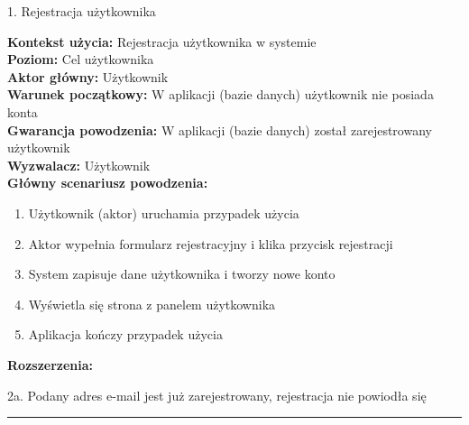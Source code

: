 {\noindent \bf{\large 1. Rejestracja użytkownika\par}}
\vspace{0.5cm}
{\noindent \bf Kontekst użycia: } Rejestracja użytkownika w systemie\\
{\bf Poziom: } Cel użytkownika\\
{\bf Aktor główny: } Użytkownik\\
{\bf Warunek początkowy: } W aplikacji (bazie danych) użytkownik nie posiada konta\\
{\bf Gwarancja powodzenia: } W aplikacji (bazie danych) został zarejestrowany użytkownik\\
{\bf Wyzwalacz: } Użytkownik\\
{\bf Główny scenariusz powodzenia: }
\begin{center}
    \begin{enumerate}
        \item Użytkownik (aktor) uruchamia przypadek użycia
        \item Aktor wypełnia formularz rejestracyjny i klika przycisk rejestracji
        \item System zapisuje dane użytkownika i tworzy nowe konto
        \item Wyświetla się strona z panelem użytkownika
        \item Aplikacja kończy przypadek użycia
    \end{enumerate}
\end{center}
{\noindent \bf Rozszerzenia: }
\begin{center}
    \begin{description}
        \item{2a.} Podany adres e-mail jest już zarejestrowany, rejestracja nie powiodła się
    \end{description}
\end{center}

\noindent\rule{14cm}{0.1pt} %

